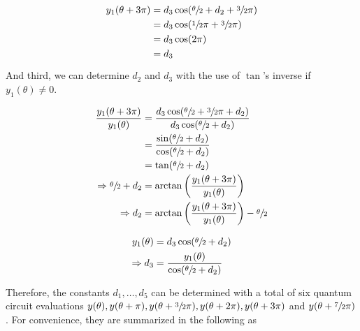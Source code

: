 \begin{equation}
    \label{eq:whateverman2-the-second}
    \begin{split}
        y_1(\theta + 3\pi)
            &= d_3 \cos(\sfrac\theta2 + d_2 + \sfrac32\pi)\\
            &= d_3 \cos(\sfrac12\pi + \sfrac32\pi)\\
            &= d_3 \cos(2\pi)\\
            &= d_3
    \end{split}
\end{equation}

And third, we can determine $d_2$ and $d_3$ with the use of $\tan$'s inverse if
$y_1(\theta) \neq 0$.

\begin{equation}
    \label{eq:d2}
    \begin{split}
        \frac{y_1(\theta + 3\pi)}{y_1(\theta)}
            &= \frac{d_3 \cos(\sfrac\theta2 + \sfrac32 \pi + d_2)}{d_3 \cos(\sfrac\theta2 + d_2)} \\
            &= \frac{\sin(\sfrac\theta2 + d_2)}{\cos(\sfrac\theta2 + d_2)} \\
            &= \tan(\sfrac\theta2 + d_2) \\
        \Rightarrow \sfrac\theta2 + d_2
            &= \arctan\left(\frac{y_1(\theta + 3\pi)}{y_1(\theta)}\right) \\
        \Rightarrow d_2
            &= \arctan\left(\frac{y_1(\theta + 3\pi)}{y_1(\theta)}\right) - \sfrac\theta2
    \end{split}
\end{equation}

\begin{equation}
    \label{eq:d3}
    \begin{split}
        y_1(\theta)
            &= d_3 \cos(\sfrac\theta2 + d_2) \\
        \Rightarrow d_3
            &= \frac{y_1(\theta)}{\cos(\sfrac\theta2 + d_2)}
    \end{split}
\end{equation}

Therefore, the constants $d_1, \dots, d_5$ can be determined with a total of six
quantum circuit evaluations
$y(\theta), y(\theta + \pi), y(\theta + \sfrac32\pi), y(\theta + 2\pi), y(\theta + 3\pi)$
and $y(\theta + \sfrac72\pi)$.
For convenience, they are summarized in the following as

